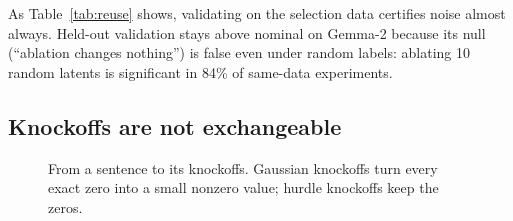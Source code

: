 As Table~\ref{tab:reuse} shows, validating on the selection data certifies noise almost always. Held-out
validation stays above nominal on Gemma-2 because its null (``ablation changes nothing'') is false even
under random labels: ablating 10 random latents is significant in 84\% of same-data experiments.

\subsection{Knockoffs are not exchangeable}
\label{sec:exch}

\begin{figure}[t]
\centering
{}
\caption{From a sentence to its knockoffs. Gaussian knockoffs turn every exact zero into a small nonzero
value; hurdle knockoffs keep the zeros.}
\label{fig:overview}
\end{figure}

\begin{table}[t]
\centering
\small
\setlength{\tabcolsep}{3pt}
\caption{Exchangeability. Gaussian: equicorrelated second-order knockoffs (the construction of \citet{enkhbayar2025}). Zero rule: accuracy of ``a value of exactly 0 is real''. AUC$_1$ / AUC$_\text{all}$:
classifier two-sample test \citep{lopezpaz2017revisiting} after swapping one / all 2,048 latents with
their knockoffs. 0.5 = indistinguishable. Hurdle on SAEBench: all 14 model--dataset settings
and the 3 thresholded Pythia settings.}
\label{tab:exch}
\end{table}

